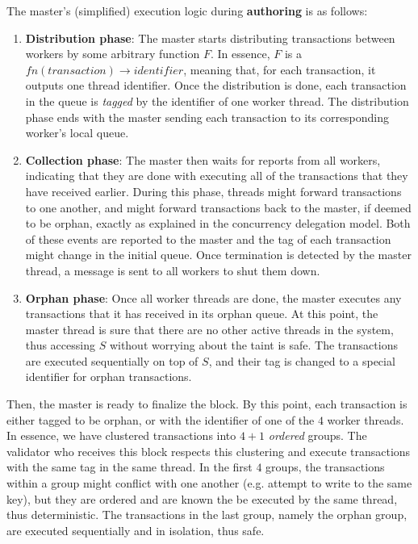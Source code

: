 The master's (simplified) execution logic during \textbf{authoring} is as follows:

\begin{enumerate}
	\item \textbf{Distribution phase}: The master starts distributing transactions between workers
	by some arbitrary function $F$. In essence, $F$ is a $fn(transaction) \rightarrow identifier$,
	meaning that, for each transaction, it outputs one thread identifier. Once the distribution is
	done, each transaction in the queue is \textit{tagged} by the identifier of one worker thread.
	The distribution phase ends with the master sending each transaction to its corresponding
	worker's local queue.

	\item \textbf{Collection phase}: The master then waits for reports from all workers, indicating
	that they are done with executing all of the transactions that they have received earlier.
	During this phase, threads might forward transactions to one another, and might forward
	transactions back to the master, if deemed to be orphan, exactly as explained in the concurrency
	delegation model. Both of these events are reported to the master and the tag of each
	transaction might change in the initial queue. Once termination is detected by the master
	thread, a message is sent to all workers to shut them down.

	\item \textbf{Orphan phase}: Once all worker threads are done, the master executes any
	transactions that it has received in its orphan queue. At this point, the master thread is sure
	that there are no other active threads in the system, thus accessing $S$ without worrying about
	the taint is safe. The transactions are executed sequentially on top of $S$, and their tag is
	changed to a special identifier for orphan transactions.
\end{enumerate}

Then, the master is ready to finalize the block. By this point, each transaction is either tagged to
be orphan, or with the identifier of one of the $4$ worker threads. In essence, we have clustered
transactions into $4 + 1$ \textit{ordered} groups. The validator who receives this block respects
this clustering and execute transactions with the same tag in the same thread. In the first $4$
groups, the transactions within a group might conflict with one another (e.g. attempt to write to
the same key), but they are ordered and are known the be executed by the same thread, thus
deterministic. The transactions in the last group, namely the orphan group, are executed
sequentially and in isolation, thus safe.

